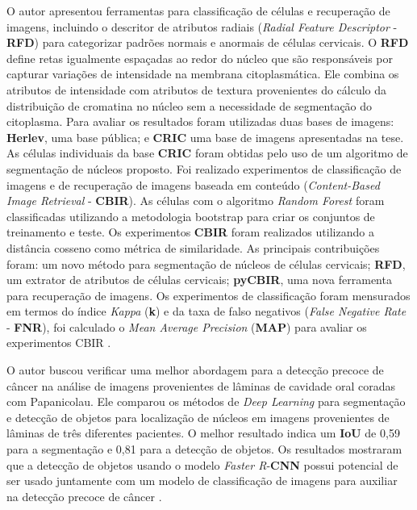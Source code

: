 \documentclass[12pt]{article}
\begin{document}
O autor apresentou ferramentas para classiﬁcação de células e recuperação de imagens, incluindo o descritor de atributos radiais (\textit{Radial Feature Descriptor} - \textbf{RFD}) para categorizar padrões normais e anormais de células cervicais. O \textbf{RFD} deﬁne retas igualmente espaçadas ao redor do núcleo que são responsáveis por capturar variações de intensidade na membrana citoplasmática. Ele combina os atributos de intensidade com atributos de textura provenientes do cálculo da distribuição de cromatina no núcleo sem a necessidade de segmentação do citoplasma. Para avaliar os resultados foram utilizadas duas bases de imagens: \textbf{Herlev}, uma base pública; e \textbf{CRIC} uma base de imagens apresentadas na tese. As células individuais da base \textbf{CRIC} foram obtidas pelo uso de um algoritmo de segmentação de núcleos proposto. Foi realizado experimentos de classiﬁcação de imagens e de recuperação de imagens baseada em conteúdo (\textit{Content-Based Image Retrieval} - \textbf{CBIR}). As células com o algoritmo \textit{Random Forest} foram classificadas utilizando a metodologia bootstrap para criar os conjuntos de treinamento e teste. Os experimentos \textbf{CBIR} foram realizados utilizando a distância cosseno como métrica de similaridade. As principais contribuições foram: um novo método para segmentação de núcleos de células cervicais; \textbf{RFD}, um extrator de atributos de células cervicais; \textbf{pyCBIR}, uma nova ferramenta para recuperação de imagens. Os experimentos de classiﬁcação foram mensurados em termos do índice \textit{Kappa} (\textbf{k}) e da taxa de falso negativos (\textit{False Negative Rate} - \textbf{FNR}), foi calculado o \textit{Mean Average Precision} (\textbf{MAP}) para avaliar os experimentos CBIR \cite{silva2018detecccao}.

O autor buscou verificar uma melhor abordagem para a detecção precoce de câncer na análise de imagens provenientes de lâminas de cavidade oral coradas com Papanicolau. Ele comparou os métodos de \textit{Deep Learning} para segmentação e detecção de objetos para localização de núcleos em imagens provenientes de lâminas de três diferentes pacientes. O melhor resultado indica um \textbf{IoU} de 0,59 para a segmentação e 0,81 para a detecção de objetos. Os resultados mostraram que a detecção de objetos usando o modelo \textit{Faster R}-\textbf{CNN} possui potencial de ser usado juntamente com um modelo de classificação de imagens para auxiliar na detecção precoce de câncer \cite{matias2021localizaccao}.
\end{document}

